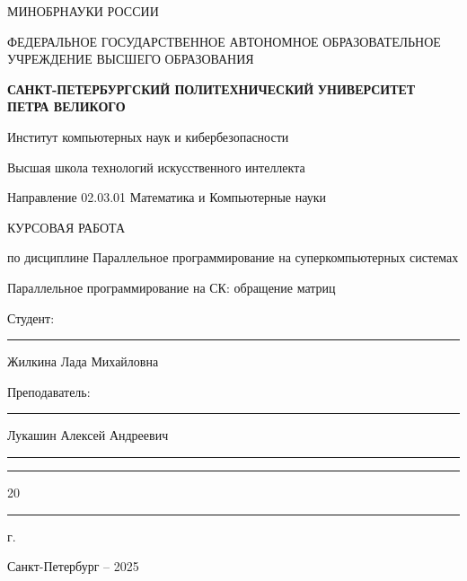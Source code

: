\thispagestyle{empty}

\begin{center}
	\large{МИНОБРНАУКИ РОССИИ} \par
	\vspace{0.3cm}
	\normalsize
	{ФЕДЕРАЛЬНОЕ ГОСУДАРСТВЕННОЕ АВТОНОМНОЕ ОБРАЗОВАТЕЛЬНОЕ УЧРЕЖДЕНИЕ ВЫСШЕГО ОБРАЗОВАНИЯ} \par
	\vspace{0.3cm}
	\textbf{\guillemotleft САНКТ-ПЕТЕРБУРГСКИЙ ПОЛИТЕХНИЧЕСКИЙ}
	\textbf{УНИВЕРСИТЕТ ПЕТРА ВЕЛИКОГО\guillemotright} \par
	\vspace{0.3cm}
	
	{Институт компьютерных наук и кибербезопасности}\par
	{Высшая школа технологий искусственного интеллекта}\par
	{Направление 02.03.01 Математика и Компьютерные науки}	
\end{center}

\vfill

\begin{center}
	{\LARGE КУРСОВАЯ РАБОТА} \par
	\vspace{0.3cm}
	{\large по дисциплине \guillemotleft Параллельное программирование на суперкомпьютерных системах\guillemotright}\par
	{\LARGE Параллельное программирование на СК: обращение матриц\\ }\par
\end{center}

\vfill

\begin{flushleft}
	Студент: \hspace{1.8cm} \rule[0pt]{2.5cm}{0.5pt}\hfill Жилкина Лада Михайловна\par
	\vspace{1.5cm}
	Преподаватель: \hspace{0.55cm} \rule[0pt]{2.5cm}{0.5pt}\hfill  Лукашин Алексей Андреевич
\end{flushleft}

\vspace{0.5cm}

\begin{flushright}
	\guillemotleft \rule[0pt]{0.8cm}{0.5pt}\guillemotright \rule[0pt]{2cm}{0.5pt} 20\rule[0pt]{0.5cm}{0.5pt} г.
\end{flushright}

\vfill

\begin{center}
	Санкт-Петербург -- 2025
\end{center}
\thispagestyle{empty}